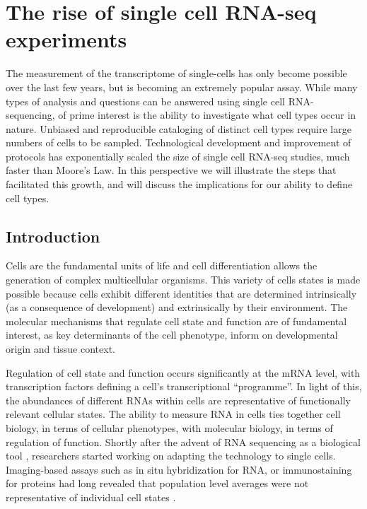 
\chapter{The rise of single cell RNA-seq experiments} \label{ch:intro}

\graphicspath{{Chapter1/Figs/}}

The measurement of the transcriptome of single-cells has only become possible over the last few years, but is becoming an extremely popular assay. While many types of analysis and questions can be answered using single cell RNA-sequencing, of prime interest is the ability to investigate what cell types occur in nature. Unbiased and reproducible cataloging of distinct cell types require large numbers of cells to be sampled. Technological development and improvement of protocols has exponentially scaled the size of single cell RNA-seq studies, much faster than Moore’s Law. In this perspective we will illustrate the steps that facilitated this growth, and will discuss the implications for our ability to define cell types.

\section{Introduction}

Cells are the fundamental units of life and cell differentiation allows the generation of complex multicellular organisms. This variety of cells states is made possible because cells exhibit different identities that are determined intrinsically (as a consequence of development) and extrinsically by their environment. The molecular mechanisms that regulate cell state and function are of fundamental interest, as key determinants of the cell phenotype, inform on developmental origin and tissue context.

Regulation of cell state and function occurs significantly at the mRNA level, with transcription factors defining a cell’s transcriptional “programme”. In light of this, the abundances of different RNAs within cells are representative of functionally relevant cellular states. The ability to measure RNA in cells ties together cell biology, in terms of cellular phenotypes, with molecular biology, in terms of regulation of function. Shortly after the advent of RNA sequencing as a biological tool \cite{Mortazavi2008-rq}, researchers started working on adapting the technology to single cells. Imaging-based assays such as in situ hybridization for RNA, or immunostaining for proteins had long revealed that population level averages were not representative of individual cell states \cite{Raj2008-wj}.

